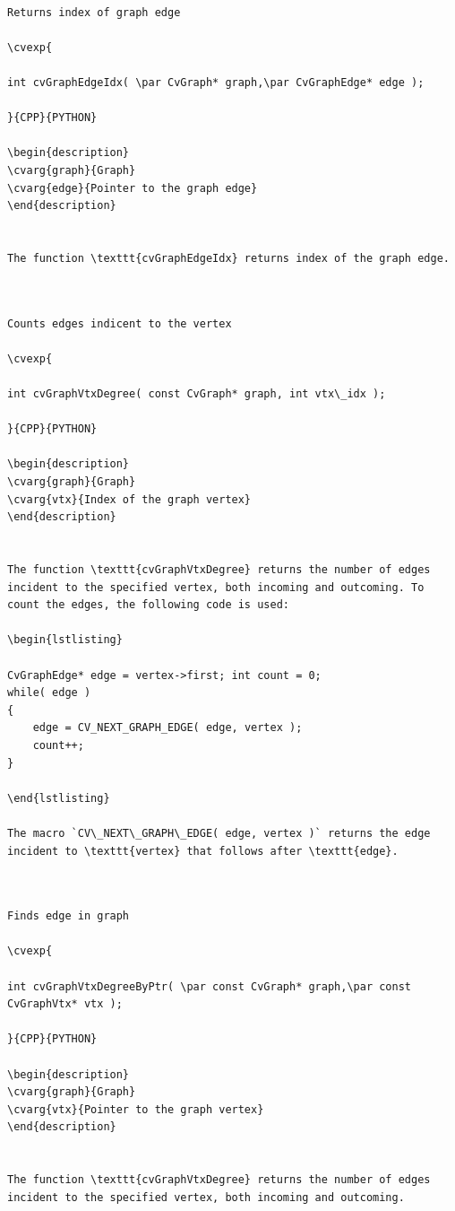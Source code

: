 \label{GraphEdgeIdx}
\begin{verbatim}

Returns index of graph edge

\cvexp{

int cvGraphEdgeIdx( \par CvGraph* graph,\par CvGraphEdge* edge );

}{CPP}{PYTHON}

\begin{description}
\cvarg{graph}{Graph}
\cvarg{edge}{Pointer to the graph edge}
\end{description}


The function \texttt{cvGraphEdgeIdx} returns index of the graph edge.


\end{verbatim}
\label{GraphVtxDegree}
\begin{verbatim}

Counts edges indicent to the vertex

\cvexp{

int cvGraphVtxDegree( const CvGraph* graph, int vtx\_idx );

}{CPP}{PYTHON}

\begin{description}
\cvarg{graph}{Graph}
\cvarg{vtx}{Index of the graph vertex}
\end{description}


The function \texttt{cvGraphVtxDegree} returns the number of edges incident to the specified vertex, both incoming and outcoming. To count the edges, the following code is used:

\begin{lstlisting}

CvGraphEdge* edge = vertex->first; int count = 0;
while( edge )
{
    edge = CV_NEXT_GRAPH_EDGE( edge, vertex );
    count++;
}

\end{lstlisting}

The macro `CV\_NEXT\_GRAPH\_EDGE( edge, vertex )` returns the edge incident to \texttt{vertex} that follows after \texttt{edge}.


\end{verbatim}
\label{GraphVtxDegreeByPtr}
\begin{verbatim}

Finds edge in graph

\cvexp{

int cvGraphVtxDegreeByPtr( \par const CvGraph* graph,\par const CvGraphVtx* vtx );

}{CPP}{PYTHON}

\begin{description}
\cvarg{graph}{Graph}
\cvarg{vtx}{Pointer to the graph vertex}
\end{description}


The function \texttt{cvGraphVtxDegree} returns the number of edges incident to the specified vertex, both incoming and outcoming.


\end{verbatim}
